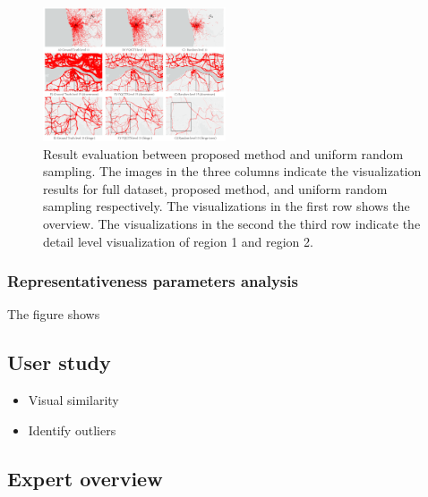 \begin{figure}[t]
	\centering
	\includegraphics[width=0.48\textwidth]{pictures/experiment_study/Mehtod_resolution_study.pdf}
	\vspace{-5mm}
	\caption{Result evaluation between proposed method and uniform random sampling. The images in the three columns indicate the visualization results for full dataset, proposed method, and uniform random sampling respectively. The visualizations in the first row shows the overview. The visualizations in the second the third row indicate the detail level visualization of region 1 and region 2. }
	\vspace{-5mm}
	\label{fig:random_proposed}
\end{figure}

\subsubsection{Representativeness parameters analysis}

The figure shows 


\subsection{User study}
\begin{itemize}[noitemsep]
    \item Visual similarity
    \item Identify outliers
\end{itemize}

\subsection{Expert overview}


